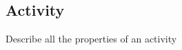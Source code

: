 \cbstart

\subsection{Activity}
\label{sec:formal activity}

\color{red}

Describe all the properties of an activity

\color{black}

\cbend